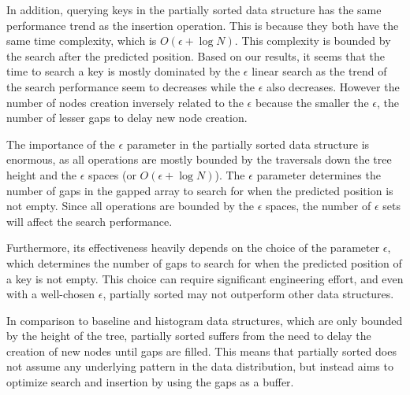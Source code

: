 In addition, querying keys in the partially sorted data structure has the same performance trend as the insertion operation. This is because they both have the same time complexity, which is $O(\epsilon+\log N)$. This complexity is bounded by the search after the predicted position. Based on our results, it seems that the time to search a key is mostly dominated by the $\epsilon$ linear search as the trend of the search performance seem to decreases while the $\epsilon$ also decreases. However the number of nodes creation inversely related to the $\epsilon$ because the smaller the $\epsilon$, the number of lesser gaps to delay new node creation. 

The importance of the $\epsilon$ parameter in the partially sorted data structure is enormous, as all operations are mostly bounded by the traversals down the tree height and the $\epsilon$ spaces (or $O(\epsilon+\log N)$). The $\epsilon$ parameter determines the number of gaps in the gapped array to search for when the predicted position is not empty. Since all operations are bounded by the $\epsilon$ spaces, the number of $\epsilon$ sets will affect the search performance. 

Furthermore, its effectiveness heavily depends on the choice of the parameter $\epsilon$, which determines the number of gaps to search for when the predicted position of a key is not empty. This choice can require significant engineering effort, and even with a well-chosen $\epsilon$, partially sorted may not outperform other data structures.

In comparison to baseline and histogram data structures, which are only bounded by the height of the tree, partially sorted suffers from the need to delay the creation of new nodes until gaps are filled. This means that partially sorted does not assume any underlying pattern in the data distribution, but instead aims to optimize search and insertion by using the gaps as a buffer.

